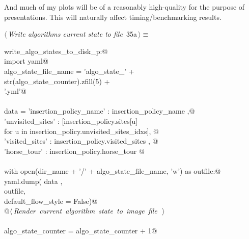 \documentclass[11.5pt]{report}
\begin{document}
And much of my plots will be of a reasonably high-quality for the purpose of presentations. This will naturally 
affect timing/benchmarking results. 

\begin{flushleft} \small\label{scrap41}\raggedright\small
{} $\langle\,${\itshape Write algorithms current state to file}\nobreak\ {\footnotesize {35a}}$\,\rangle\equiv$
\vspace{-1ex}
\begin{list}{}{} \item
\mbox{}\verb@if write_algo_states_to_disk_p:@\\
\mbox{}\verb@     import yaml@\\
\mbox{}\verb@     algo_state_file_name = 'algo_state_'                    + \@\\
\mbox{}\verb@                       str(algo_state_counter).zfill(5) + \@\\
\mbox{}\verb@                       '.yml'@\\
\mbox{}\verb@@\\
\mbox{}\verb@     data = {'insertion_policy_name' : insertion_policy_name                       ,@\\
\mbox{}\verb@             'unvisited_sites'       : [insertion_policy.sites[u] \@\\
\mbox{}\verb@                                            for u in insertion_policy.unvisited_sites_idxs], @\\
\mbox{}\verb@             'visited_sites'         : insertion_policy.visited_sites                    , @\\
\mbox{}\verb@             'horse_tour'            : insertion_policy.horse_tour }@\\
\mbox{}\verb@@\\
\mbox{}\verb@     with open(dir_name + '/' + algo_state_file_name, 'w') as outfile:@\\
\mbox{}\verb@          yaml.dump( data   , \@\\
\mbox{}\verb@                     outfile, \@\\
\mbox{}\verb@                     default_flow_style = False)@\\
\mbox{}\verb@          @\hbox{$\langle\,${\itshape Render current algorithm state to image file}\nobreak\ {\footnotesize {}}$\,\rangle$}\verb@@\\
\mbox{}\verb@@\\
\mbox{}\verb@     algo_state_counter = algo_state_counter + 1@\\

\end{list}
\end{flushleft}
\end{document}

